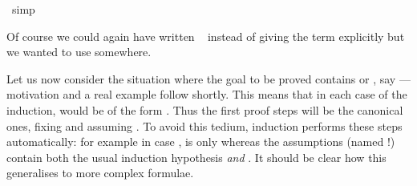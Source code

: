\begin{isabellebody}
\ simp\isanewline
\isamarkupfalse%
%
\endisatagproof
{\isafoldproof}%
%
\isadelimproof
%
\endisadelimproof
\isamarkuptrue%
%
\begin{isamarkuptext}%
\noindent Of course we could again have written
~ instead of giving the term explicitly
but we wanted to use  somewhere.%
\end{isamarkuptext}%
\isamarkuptrue%
%
\isamarkuptrue%
%
\begin{isamarkuptext}%
Let us now consider the situation where the goal to be proved contains
\isa{{\isasymAnd}} or \isa{{\isasymLongrightarrow}}, say  --- motivation and a
real example follow shortly.  This means that in each case of the induction,
 would be of the form .  Thus the
first proof steps will be the canonical ones, fixing  and assuming
. To avoid this tedium, induction performs these steps
automatically: for example in case ,  is only
 whereas the assumptions (named !) contain both the
usual induction hypothesis \emph{and} .
It should be clear how this generalises to more complex formulae.


\end{isamarkuptext}
\end{isabellebody}
